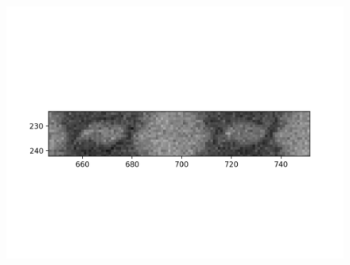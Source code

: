 \documentclass[10pt,a4paper]{article}
\begin{document}
	\begin{figure}[h]
		\includegraphics{data/image_stamps/f12}
	\end{figure}
\end{document}
